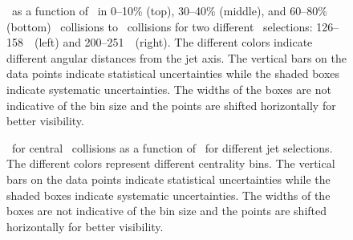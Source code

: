 \begin{figure}
   \caption{\RDptr\ as a function of \pt\ in  0--10\% (top), 30--40\% (middle), and 60--80\% (bottom) \PbPb\ collisions to \pp\ collisions for two different \ptjet\ selections: 126--158~\GeV\ (left) and 200--251~\GeV\ (right). The different colors indicate different angular distances from the jet axis. The vertical bars on the data points indicate statistical uncertainties while the shaded boxes indicate systematic uncertainties. The widths of the boxes are not indicative of the bin size and the points are shifted horizontally for better visibility.}
      \label{fig:pttrkdep}
\end{figure}

\begin{figure}
   \caption{\RDptr\ for central \pbpb\ collisions as a function of \pt\ for different jet selections. The different colors represent different centrality bins. The vertical bars on the data points indicate statistical uncertainties while the shaded boxes indicate systematic uncertainties. The widths of the boxes are not indicative of the bin size and the points are shifted horizontally for better visibility.}
      \label{fig:rdptr_trk_cent}
\end{figure}




